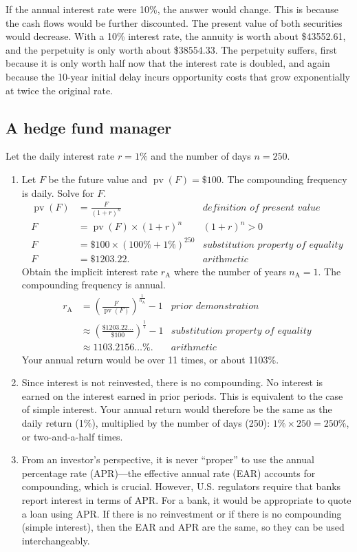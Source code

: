 \documentclass[12pt]{article}
\DeclareMathOperator{\pv}{pv}
\begin{document}
If the annual interest rate were 10\%, the answer would change. This is because the cash flows would be further discounted. The present value of both securities would decrease. With a 10\% interest rate, the annuity is worth about \$43552.61, and the perpetuity is only worth about \$38554.33. The perpetuity suffers, first because it is only worth half now that the interest rate is doubled, and again because the 10-year initial delay incurs opportunity costs that grow exponentially at twice the original rate.
\subsection{A hedge fund manager}
Let the daily interest rate $r=1\%$ and the number of days $n=250$.
\begin{enumerate}
\item Let $F$ be the future value and $\pv(F)=\$100$. The compounding frequency is daily. Solve for $F$.
\begin{align*}
\pv(F)&=\frac{F}{(1+r)^n}&\textit{definition of present value}\\
F&=\pv(F)\times(1+r)^n&(1+r)^n>0\\
F&=\$100\times(100\%+1\%)^{250}&\textit{substitution property of equality}\\
F&=\$1203.22.&\textit{arithmetic}
\end{align*}
Obtain the implicit interest rate $r_\mathrm{A}$ where the number of years $n_\mathrm{A}=1$. The compounding frequency is annual.
\begin{align*}
r_{\mathrm{A}}
&=\left(\frac{F}{\pv(F)}\right)^{\frac{1}{n_\mathrm{A}}}-1&\textit{prior demonstration}\\
&\approx\left(\frac{\$1203.22\dots}{\$100}\right)^{\frac{1}{1}}-1&\textit{substitution property of equality}\\
&\approx 1103.2156\dots\%.&\textit{arithmetic}
\end{align*}
Your annual return would be over 11 times, or about 1103\%.
\item Since interest is not reinvested, there is no compounding. No interest is earned on the interest earned in prior periods. This is equivalent to the case of simple interest. Your annual return would therefore be the same as the daily return (1\%), multiplied by the number of days (250): $1\%\times 250=250\%$, or two-and-a-half times.
\item From an investor's perspective, it is never ``proper'' to use the annual percentage rate (APR)---the effective annual rate (EAR) accounts for compounding, which is crucial. However, U.S. regulators require that banks report interest in terms of APR. For a bank, it would be appropriate to quote a loan using APR. If there is no reinvestment or if there is no compounding (simple interest), then the EAR and APR are the same, so they can be used interchangeably.
\end{enumerate}
\end{document}
